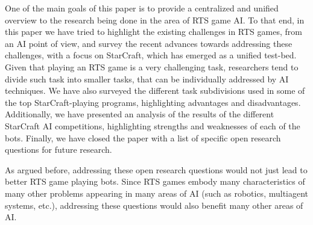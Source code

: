 \documentclass[journal]{IEEEtran}
\begin{document}
One of the main goals of this paper is to provide a centralized and unified overview to the research being done in the area of RTS game AI. To that end, in this paper we have tried to highlight the existing challenges in RTS games, from an AI point of view, and survey the recent advances towards addressing these challenges, with a focus on StarCraft, which has emerged as a unified test-bed. Given that playing an RTS game is a very challenging task, researchers tend to divide such task into smaller tasks, that can be individually addressed by AI techniques. We have also surveyed the different task subdivisions used in some of the top StarCraft-playing programs, highlighting advantages and disadvantages. Additionally, we have presented an analysis of the results of the different StarCraft AI competitions, highlighting strengths and weaknesses of each of the bots. Finally, we have closed the paper with a list of specific open research questions for future research.

As argued before, addressing these open research questions would not just lead to better RTS game playing bots. Since RTS games embody many characteristics of many other problems appearing in many areas of AI (such as robotics, multiagent systems, etc.), addressing these questions would also benefit many other areas of AI. 







\ifCLASSOPTIONcaptionsoff
  \newpage
\fi

                                                    



\end{document}
